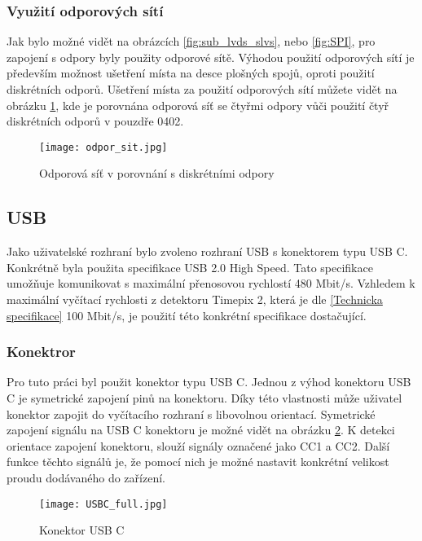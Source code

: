 	\subsubsection{Využití odporových sítí} %
	Jak bylo možné vidět na obrázcích \ref{fig:sub_lvds_slvs}, nebo \ref{fig:SPI}, pro zapojení s odpory byly použity odporové sítě. Výhodou použití odporových sítí je především možnost ušetření místa na desce plošných spojů, oproti použití diskrétních odporů. Ušetření místa za použití odporových sítí můžete vidět na obrázku \ref{fig:odpor_sit}, kde je porovnána odporová síť se čtyřmi odpory vůči použití čtyř diskrétních odporů v pouzdře 0402.
	\begin{figure}[h!]
		\centering
		\captionsetup{justification=centering}
		\texttt{[image: odpor\_sit.jpg]}
		\caption{Odporová síť v porovnání s diskrétními odpory} 
		\label{fig:odpor_sit}
	\end{figure}
	
	\subsection{USB} %
	\label{USB}
	Jako uživatelské rozhraní bylo zvoleno rozhraní USB s konektorem typu USB C. Konkrétně byla použita specifikace USB 2.0 High Speed. Tato specifikace umožňuje komunikovat s maximální přenosovou rychlostí 480 Mbit/s. Vzhledem k maximální vyčítací rychlosti z detektoru Timepix 2, která je dle \ref{Technicka specifikace} 100 Mbit/s, je použití této konkrétní specifikace dostačující. 
	\subsubsection{Konektror}
	Pro tuto práci byl použit konektor typu USB C. Jednou z výhod konektoru USB C je symetrické zapojení pinů na konektoru. Díky této vlastnosti může uživatel konektor zapojit do vyčítacího rozhraní s libovolnou orientací. Symetrické zapojení signálu na USB C konektoru je možné vidět na obrázku \ref{fig:USBC_full}. K detekci orientace zapojení konektoru, slouží signály označené jako CC1 a CC2. Další funkce těchto signálů je, že pomocí nich je možné nastavit konkrétní velikost proudu dodávaného do zařízení. 
	\begin{figure}[h!]
		\centering
		\captionsetup{justification=centering}
		\texttt{[image: USBC\_full.jpg]}
		\caption{Konektor USB C} 
		\label{fig:USBC_full}
	\end{figure} 

